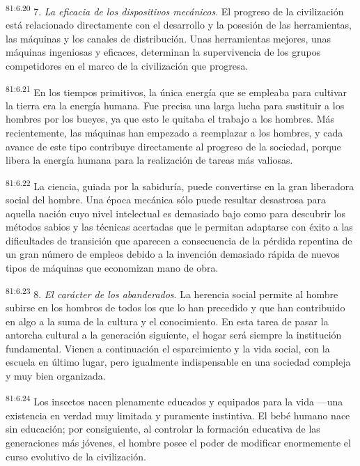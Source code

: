 \par
\textsuperscript{81:6.20} 7. \textit{La eficacia de los dispositivos mecánicos}. El progreso de la civilización está relacionado directamente con el desarrollo y la posesión de las herramientas, las máquinas y los canales de distribución. Unas herramientas mejores, unas máquinas ingeniosas y eficaces, determinan la supervivencia de los grupos competidores en el marco de la civilización que progresa.

\par
\textsuperscript{81:6.21} En los tiempos primitivos, la única energía que se empleaba para cultivar la tierra era la energía humana. Fue precisa una larga lucha para sustituir a los hombres por los bueyes, ya que esto le quitaba el trabajo a los hombres. Más recientemente, las máquinas han empezado a reemplazar a los hombres, y cada avance de este tipo contribuye directamente al progreso de la sociedad, porque libera la energía humana para la realización de tareas más valiosas.

\par
\textsuperscript{81:6.22} La ciencia, guiada por la sabiduría, puede convertirse en la gran liberadora social del hombre. Una época mecánica sólo puede resultar desastrosa para aquella nación cuyo nivel intelectual es demasiado bajo como para descubrir los métodos sabios y las técnicas acertadas que le permitan adaptarse con éxito a las dificultades de transición que aparecen a consecuencia de la pérdida repentina de un gran número de empleos debido a la invención demasiado rápida de nuevos tipos de máquinas que economizan mano de obra.

\par
\textsuperscript{81:6.23} 8. \textit{El carácter de los abanderados}. La herencia social permite al hombre subirse en los hombros de todos los que lo han precedido y que han contribuido en algo a la suma de la cultura y el conocimiento. En esta tarea de pasar la antorcha cultural a la generación siguiente, el hogar será siempre la institución fundamental. Vienen a continuación el esparcimiento y la vida social, con la escuela en último lugar, pero igualmente indispensable en una sociedad compleja y muy bien organizada.

\par
\textsuperscript{81:6.24} Los insectos nacen plenamente educados y equipados para la vida ---una existencia en verdad muy limitada y puramente instintiva. El bebé humano nace sin educación; por consiguiente, al controlar la formación educativa de las generaciones más jóvenes, el hombre posee el poder de modificar enormemente el curso evolutivo de la civilización.

